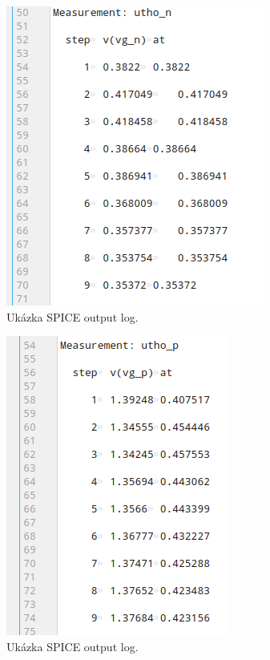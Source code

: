 \begin{figure}[h!]
    \centering
    \includegraphics[]{img/log3.png}
    \caption{Ukázka SPICE output log.}
    \label{fig:img/log1.png}
\end{figure}

\begin{figure}[h!]
    \centering
    \includegraphics[]{img/log4.png}
    \caption{Ukázka SPICE output log.}
    \label{fig:img/log1.png}
\end{figure}

